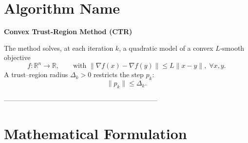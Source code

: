 \documentclass{article}
\begin{document}
\section*{Algorithm Name}
\textbf{Convex Trust‑Region Method (CTR)}  

The method solves, at each iteration $k$, a quadratic model of a convex $L$‑smooth objective
\[
f:\mathbb{R}^{n}\rightarrow\mathbb{R},
\qquad 
\text{with } \|\nabla f(x)-\nabla f(y)\|\le L\|x-y\|,\;\forall x,y .
\]
A trust–region radius $\Delta_k>0$ restricts the step $p_k$:
\[
\|p_k\|\le \Delta_k .
\]

--------------------------------------------------------------------

\section*{Mathematical Formulation}
\end{document}
